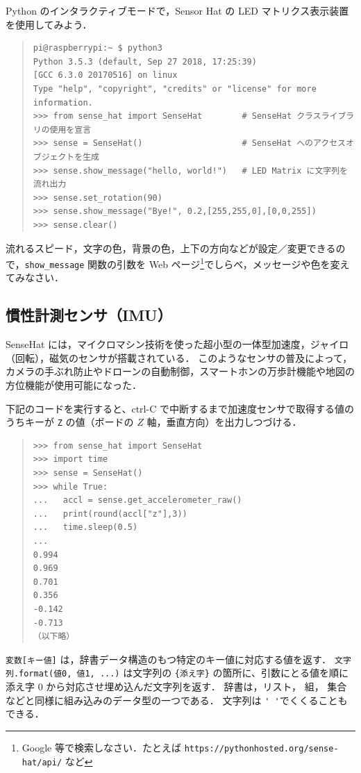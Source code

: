 \documentclass[11pt,a4,epsf]{report}
\begin{document}
Python のインタラクティブモードで，Sensor Hat の LED マトリクス表示装置を使用してみよう．
\begin{quote}
\small
\begin{verbatim}
pi@raspberrypi:~ $ python3
Python 3.5.3 (default, Sep 27 2018, 17:25:39) 
[GCC 6.3.0 20170516] on linux
Type "help", "copyright", "credits" or "license" for more information.
>>> from sense_hat import SenseHat        # SenseHat クラスライブラリの使用を宣言
>>> sense = SenseHat()                    # SenseHat へのアクセスオブジェクトを生成
>>> sense.show_message("hello, world!")   # LED Matrix に文字列を流れ出力
>>> sense.set_rotation(90)
>>> sense.show_message("Bye!", 0.2,[255,255,0],[0,0,255])
>>> sense.clear()
\end{verbatim}
\end{quote}

\begin{excercise}
流れるスピード，文字の色，背景の色，上下の方向などが設定／変更できるので，\verb+show_message+ 関数の引数を Web ページ\footnote{Google 等で検索しなさい．たとえば {\tt https://pythonhosted.org/sense-hat/api/} など}でしらべ，メッセージや色を変えてみなさい．
\end{excercise}

\subsection{慣性計測センサ（IMU）}

SenseHat には，マイクロマシン技術を使った超小型の一体型加速度，ジャイロ（回転），磁気のセンサが搭載されている．
このようなセンサの普及によって，カメラの手ぶれ防止やドローンの自動制御，スマートホンの万歩計機能や地図の方位機能が使用可能になった．

下記のコードを実行すると、ctrl-C で中断するまで加速度センサで取得する値のうちキーが \verb+Z+ の値（ボードの $Z$ 軸，垂直方向）を出力しつづける．
\begin{quote}
\small
\begin{verbatim}
>>> from sense_hat import SenseHat 
>>> import time
>>> sense = SenseHat() 
>>> while True:
...   accl = sense.get_accelerometer_raw()
...   print(round(accl["z"],3))
...   time.sleep(0.5)
... 
0.994
0.969
0.701
0.356
-0.142
-0.713
（以下略）
\end{verbatim}
\end{quote}
\verb+変数[キー値]+ は，辞書データ構造のもつ特定のキー値に対応する値を返す．
\verb+文字列.format(値0, 値1, ...)+ は文字列の \verb+{添え字}+ の箇所に、引数にとる値を順に添え字 0 から対応させ埋め込んだ文字列を返す．
辞書は，リスト， 組， 集合などと同様に組み込みのデータ型の一つである．
文字列は \verb+' '+でくくることもできる．
\end{document}
